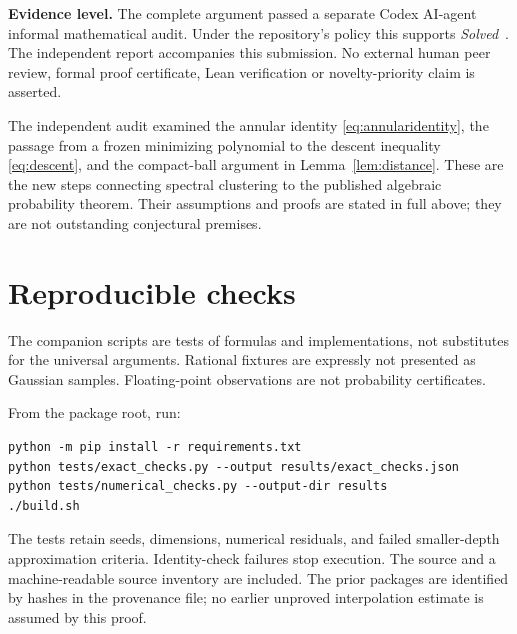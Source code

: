 \documentclass[11pt]{article}
\numberwithin{equation}{section}
\theoremstyle{definition}
\begin{document}
\textbf{Evidence level.} The complete argument passed a separate Codex AI-agent informal mathematical audit. Under the repository's policy this supports \emph{Solved}~\cite{guidelines}. The independent report accompanies this submission. No external human peer review, formal proof certificate, Lean verification or novelty-priority claim is asserted.

The independent audit examined the annular identity \eqref{eq:annularidentity}, the passage from a frozen minimizing polynomial to the descent inequality \eqref{eq:descent}, and the compact-ball argument in Lemma~\ref{lem:distance}. These are the new steps connecting spectral clustering to the published algebraic probability theorem. Their assumptions and proofs are stated in full above; they are not outstanding conjectural premises.

\section{Reproducible checks}\label{sec:checks}
The companion scripts are tests of formulas and implementations, not substitutes for the universal arguments. Rational fixtures are expressly not presented as Gaussian samples. Floating-point observations are not probability certificates.



From the package root, run:
\begin{Verbatim}[fontsize=\small]
python -m pip install -r requirements.txt
python tests/exact_checks.py --output results/exact_checks.json
python tests/numerical_checks.py --output-dir results
./build.sh
\end{Verbatim}
The tests retain seeds, dimensions, numerical residuals, and failed smaller-depth approximation criteria. Identity-check failures stop execution. The source and a machine-readable source inventory are included. The prior packages are identified by hashes in the provenance file; no earlier unproved interpolation estimate is assumed by this proof.
\end{document}

